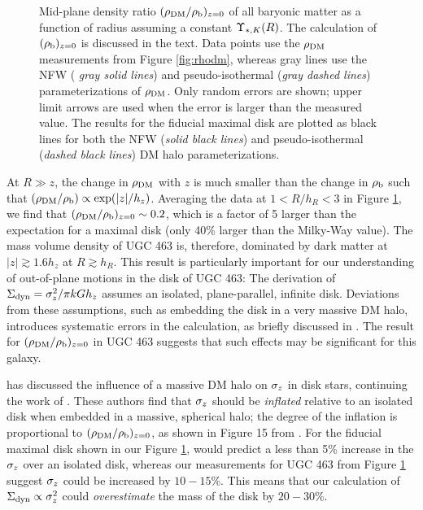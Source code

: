 \documentclass[apj,iop,numberedappendix]{emulateapj}
\begin{document}
\begin{figure}
\caption{
%
Mid-plane density ratio $(\rho_{\rm DM}/\rho_{\rm b})_{z=0}$ of all baryonic matter as a
function of radius assuming a constant $\Upsilon_{\ast,K}(R)$.  The calculation of
$(\rho_{\rm b})_{z=0}$ is discussed in the text.  Data points use the $\rho_{\rm DM}$
measurements from Figure \ref{fig:rhodm}, whereas gray lines use the NFW ({\it
gray solid lines}) and pseudo-isothermal ({\it gray dashed lines})
parameterizations of $\rho_{\rm DM}$.  Only random errors are shown; upper limit arrows
are used when the error is larger than the measured value.  The results for the
fiducial maximal disk are plotted as black lines for both the NFW ({\it solid
black lines}) and pseudo-isothermal ({\it dashed black lines}) DM halo
parameterizations.
%
}
\label{fig:rhoh2d}
\end{figure}

At $R \gg z$, the change in $\rho_{\rm DM}$ with $z$ is much smaller than the change in
$\rho_{\rm b}$ such that $(\rho_{\rm DM}/\rho_{\rm b}) \propto \exp(|z|/h_z)$.  Averaging the
data at $1<R/h_R<3$ in Figure \ref{fig:rhoh2d}, we find that
$(\rho_{\rm DM}/\rho_{\rm b})_{z=0} \sim 0.2$, which is a factor of 5 larger than the
expectation for a maximal disk (only 40\% larger than the Milky-Way value).  The
mass volume density of UGC 463 is, therefore, dominated by dark matter at $|z|
\gtrsim 1.6 h_z$ at $R\gtrsim h_R$.  This result is particularly important for
our understanding of out-of-plane motions in the disk of UGC 463: The derivation
of $\Sigma_{\rm dyn} = \sigma_z^2/\pi k G h_z$ assumes an isolated, plane-parallel, infinite
disk.  Deviations from these assumptions, such as embedding the disk in a very
massive DM halo, introduces systematic errors in the calculation, as briefly
discussed in .  The result for
$(\rho_{\rm DM}/\rho_{\rm b})_{z=0}$ in UGC 463 suggests that such effects may be
significant for this galaxy.

\citet{1993A&A...275...16B} has discussed the influence of a massive DM halo on
$\sigma_z$ in disk stars, continuing the work of \citet{1984ApJ...276..156B}.
These authors find that $\sigma_z$ should be {\it inflated} relative to an isolated
disk when embedded in a massive, spherical halo; the degree of the inflation is
proportional to $(\rho_{\rm DM}/\rho_{\rm b})_{z=0}$, as shown in Figure 15 from
\citet{1993A&A...275...16B}.  For the fiducial maximal disk shown in our Figure
\ref{fig:rhoh2d}, \citet{1993A&A...275...16B} would predict a less than 5\%
increase in the $\sigma_z$ over an isolated disk, whereas our measurements for UGC
463 from Figure \ref{fig:rhoh2d} suggest $\sigma_z$ could be increased by
$10-15$\%.  This means that our calculation of $\Sigma_{\rm dyn} \propto \sigma_z^2$ could
{\it overestimate} the mass of the disk by $20-30$\%.
\end{document}
